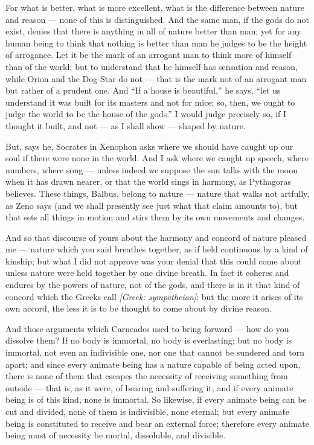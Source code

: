  For what is better, what is more excellent, what is the difference between nature and reason — none of this is distinguished. And the same man, if the gods do not exist, denies that there is anything in all of nature better than man; yet for any human being to think that nothing is better than man he judges to be the height of arrogance. Let it be the mark of an arrogant man to think more of himself than of the world; but to understand that he himself has sensation and reason, while Orion and the Dog-Star do not — that is the mark not of an arrogant man but rather of a prudent one. And ``If a house is beautiful,'' he says, ``let us understand it was built for its masters and not for mice; so, then, we ought to judge the world to be the house of the gods.'' I would judge precisely so, if I thought it built, and not — as I shall show — shaped by nature.

 But, says he, Socrates in Xenophon asks where we should have caught up our soul if there were none in the world. And I ask where we caught up speech, where numbers, where song — unless indeed we suppose the sun talks with the moon when it has drawn nearer, or that the world sings in harmony, as Pythagoras believes. These things, Balbus, belong to nature — nature that walks not artfully, as Zeno says (and we shall presently see just what that claim amounts to), but that sets all things in motion and stirs them by its own movements and changes.

 And so that discourse of yours about the harmony and concord of nature pleased me — nature which you said breathes together, as if held continuous by a kind of kinship; but what I did not approve was your denial that this could come about unless nature were held together by one divine breath. In fact it coheres and endures by the powers of nature, not of the gods, and there is in it that kind of concord which the Greeks call \textit{[Greek: sympatheian]}; but the more it arises of its own accord, the less it is to be thought to come about by divine reason.

 And those arguments which Carneades used to bring forward — how do you dissolve them? If no body is immortal, no body is everlasting; but no body is immortal, not even an indivisible one, nor one that cannot be sundered and torn apart; and since every animate being has a nature capable of being acted upon, there is none of them that escapes the necessity of receiving something from outside — that is, as it were, of bearing and suffering it; and if every animate being is of this kind, none is immortal. So likewise, if every animate being can be cut and divided, none of them is indivisible, none eternal; but every animate being is constituted to receive and bear an external force; therefore every animate being must of necessity be mortal, dissoluble, and divisible.

